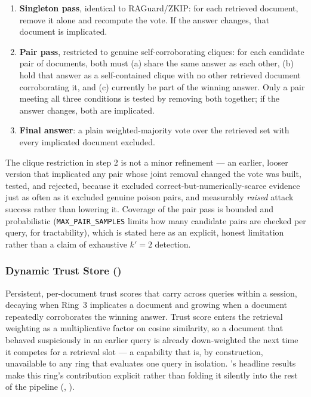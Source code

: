 \begin{enumerate}
\item \textbf{Singleton pass}, identical to RAGuard/ZKIP: for each
  retrieved document, remove it alone and recompute the vote. If the
  answer changes, that document is implicated.
\item \textbf{Pair pass}, restricted to genuine self-corroborating
  cliques: for each candidate pair of documents, both must (a) share the
  same answer as each other, (b) hold that answer as a self-contained
  clique with no other retrieved document corroborating it, and (c)
  currently be part of the winning answer. Only a pair meeting all three
  conditions is tested by removing both together; if the answer changes,
  both are implicated.
\item \textbf{Final answer}: a plain weighted-majority vote over the
  retrieved set with every implicated document excluded.
\end{enumerate}

The clique restriction in step 2 is not a minor refinement --- an
earlier, looser version that implicated any pair whose joint removal
changed the vote was built, tested, and rejected, because it excluded
correct-but-numerically-scarce evidence just as often as it excluded
genuine poison pairs, and measurably \emph{raised} attack success rather
than lowering it. Coverage of the pair pass is bounded and probabilistic
(\texttt{MAX\_PAIR\_SAMPLES} limits how many candidate pairs are checked
per query, for tractability), which is stated here as an explicit, honest
limitation rather than a claim of exhaustive $k'{=}2$ detection.

\subsubsection{Dynamic Trust Store ()}
\label{sec:trust-store}

Persistent, per-document trust scores that carry across queries within a
session, decaying when Ring~3 implicates a document and growing when a
document repeatedly corroborates the winning answer. Trust score enters
the retrieval weighting as a multiplicative factor on cosine similarity,
so a document that behaved suspiciously in an earlier query is already
down-weighted the next time it competes for a retrieval slot --- a
capability that is, by construction, unavailable to any ring that
evaluates one query in isolation. 's headline results
make this ring's contribution explicit rather than folding it silently
into the rest of the pipeline (,
).

